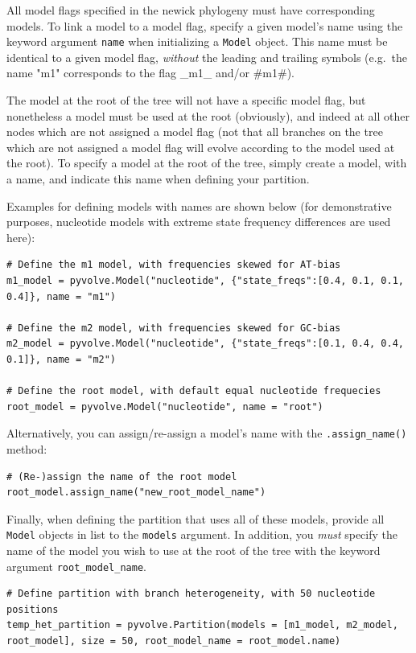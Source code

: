 \documentclass{article}
\newcommand{\code}[1]{\texttt{\small{#1}}}
\begin{document}
All model flags specified in the newick phylogeny must have corresponding models. To link a model to a model flag, specify a given model's name using the keyword argument \code{name} when initializing a \code{Model} object. This name must be identical to a given model flag, \emph{without} the leading and trailing symbols (e.g.\ the name "m1" corresponds to the flag \_m1\_ and/or \#m1\#).

The model at the root of the tree will not have a specific model flag, but nonetheless a model must be used at the root (obviously), and indeed at all other nodes which are not assigned a model flag (not that all branches on the tree which are not assigned a model flag will evolve according to the model used at the root). To specify a model at the root of the tree, simply create a model, with a name, and indicate this name when defining your partition.

Examples for defining models with names are shown below (for demonstrative purposes, nucleotide models with extreme state frequency differences are used here):
\begin{lstlisting}
# Define the m1 model, with frequencies skewed for AT-bias
m1_model = pyvolve.Model("nucleotide", {"state_freqs":[0.4, 0.1, 0.1, 0.4]}, name = "m1")

# Define the m2 model, with frequencies skewed for GC-bias
m2_model = pyvolve.Model("nucleotide", {"state_freqs":[0.1, 0.4, 0.4, 0.1]}, name = "m2")

# Define the root model, with default equal nucleotide frequecies
root_model = pyvolve.Model("nucleotide", name = "root")
\end{lstlisting}

Alternatively, you can assign/re-assign a model's name with the \code{.assign\_name()} method:
\begin{lstlisting}
# (Re-)assign the name of the root model
root_model.assign_name("new_root_model_name")
\end{lstlisting}



Finally, when defining the partition that uses all of these models, provide all \code{Model} objects in list to the \code{models} argument. In addition, you \emph{must} specify the name of the model you wish to use at the root of the tree with the keyword argument \code{root\_model\_name}.
\begin{lstlisting}
# Define partition with branch heterogeneity, with 50 nucleotide positions
temp_het_partition = pyvolve.Partition(models = [m1_model, m2_model, root_model], size = 50, root_model_name = root_model.name) 
\end{lstlisting}
\end{document}
